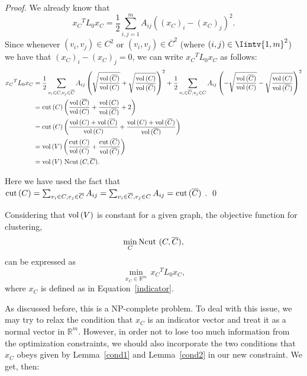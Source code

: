 \begin{proof}
   We already know that
   \begin{equation*}
         {x_C}^TL_0{x_C} = \frac{1}{2} \sum_{i,j=1}^m A_{ij} ((x_C)_i - (x_C)_j) ^2 .
   \end{equation*}
   Since whenever $(v_i, v_j) \in C^2$ or $(v_i, v_j) \in {\overline C}^2$ (where $(i,j) \in \Iintv{1,m}^2$) we have that $(x_C)_i - (x_C)_j = 0$, we can write ${x_C}^TL_0{x_C}$ as follows:
   \begin{equation*}
      \begin{split}
         {x_C}^TL_0{x_C} &=  \frac{1}{2} \sum_{v_i \in C, v_j \in \overline C}A_{ij} \left( \sqrt{\frac{\operatorname*{vol\,} (\overline C)}{\operatorname*{vol\,} (C)}} + \sqrt{\frac{\operatorname*{vol\,} (C)}{\operatorname*{vol\,} (\overline C)}} \right)^2 + \frac{1}{2} \sum_{v_i \in \overline C, v_j \in C} A_{ij} \left( -\sqrt{\frac{\operatorname*{vol\,} (\overline C)}{\operatorname*{vol\,} (C)}}  -\sqrt{\frac{\operatorname*{vol\,} (C)}{\operatorname*{vol\,} (\overline C)}} \right)^2 \\
         &= \operatorname{cut\,} (C) \left( \frac{\operatorname*{vol\,} (\overline C)}{\operatorname*{vol\,} (C)} + \frac{\operatorname*{vol\,} (C)}{\operatorname*{vol\,} (\overline C)} + 2 \right) \\
         &= \operatorname{cut\,} (C) \left( \frac{\operatorname*{vol\,} (C) + \operatorname*{vol\,} (\overline C)}{\operatorname*{vol\,} (C)} + \frac{\operatorname*{vol\,} (C) + \operatorname*{vol\,} (\overline C)}{\operatorname*{vol\,} (\overline C)} \right) \\
         &= \operatorname*{vol\,} (V) \left( \frac{\operatorname{cut\,}(C)}{\operatorname*{vol\,} (C)} + \frac{\operatorname{cut\,}(\overline C)}{\operatorname*{vol\,} (\overline C)} \right) \\
         &= \operatorname*{vol\,} (V)\, \operatorname*{Ncut\,}(C, \overline C).
      \end{split}
   \end{equation*}

Here we have used the fact that $\operatorname{cut\,}(C) = \sum_{v_i \in C, v_j \in \overline C} A_{ij} =\sum_{v_i \in \overline C, v_j \in C} A_{ij} = \operatorname{cut\,}(\overline C)$ . \qed
\end{proof}

Considering that $\operatorname*{vol\,} (V)$ is constant for a given graph, the objective function for clustering,
\begin{equation}
   \min_C \operatorname*{Ncut\,}\,(C, \overline C),
\end{equation}
can be expressed as
\begin{equation}\label{npequation}
   \min_{x_C \in \mathbb R^{m }} \,{x_C}^T L_0 x_C \text{,}
\end{equation}
where $x_C$ is defined as in Equation~\vref{indicator}.

As discussed before, this is a NP-complete problem.
To deal with this issue, we may try to relax the condition that $x_C$ is an indicator vector and treat it as a normal vector in $\mathbb R^{m }$.
However, in order not to lose too much information from the optimization constraints, we should also incorporate the two conditions that $x_C$ obeys given by Lemma~\ref{cond1} and Lemma~\vref{cond2} in our new constraint. We get, then:

